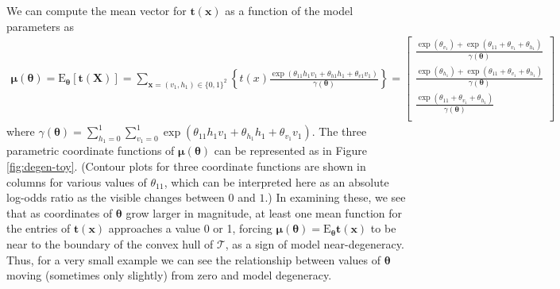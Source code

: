 \documentclass[AMS,STIX1COL]{WileyNJD-v2}
\begin{document}
We can compute the mean vector for \(\boldsymbol t(\boldsymbol x)\) as a
function of the model parameters as \begin{align*}
\boldsymbol \mu(\boldsymbol \theta) = \text{E}_{\boldsymbol \theta}\left[ \boldsymbol t(\boldsymbol X) \right] =  \sum\limits_{\boldsymbol x = (v_1, h_1) \in \{0,1\}^2} \left\{ t(x) \frac{\exp\left( \theta_{11} h_1 v_1 + \theta_{h1} h_1 + \theta_{v1} v_1\right)}{\gamma(\boldsymbol \theta)} \right\} = \left[
\begin{matrix}
\frac{\exp\left(\theta_{v_1}\right) + \exp\left(\theta_{11} + \theta_{v_1} + \theta_{h_1}\right)}{\gamma(\boldsymbol \theta)} \\
\frac{\exp\left(\theta_{h_1}\right) + \exp\left(\theta_{11} + \theta_{v_1} + \theta_{h_1}\right)}{\gamma(\boldsymbol \theta)} \\
\frac{\exp\left(\theta_{11} + \theta_{v_1} + \theta_{h_1}\right)}{\gamma(\boldsymbol \theta)} \\
\end{matrix} \right]
\end{align*} where
\(\gamma(\boldsymbol \theta) = \sum\limits_{h_1 = 0}^1\sum\limits_{v_1 = 0}^1 \exp(\theta_{11} h_1 v_1 + \theta_{h_1}h_1 + \theta_{v_1}v_1)\).
The three parametric coordinate functions of
\(\boldsymbol \mu(\boldsymbol \theta)\) can be represented as in Figure
\ref{fig:degen-toy}. (Contour plots for three coordinate functions are
shown in columns for various values of \(\theta_{11}\), which can be
interpreted here as an absolute log-odds ratio as the visible changes
between \(0\) and \(1\).) In examining these, we see that as coordinates
of \(\boldsymbol \theta\) grow larger in magnitude, at least one mean
function for the entries of \(\boldsymbol t(\boldsymbol x)\) approaches
a value 0 or 1, forcing
\(\boldsymbol \mu(\boldsymbol \theta) = \text{E}_{\boldsymbol \theta} \boldsymbol t(\boldsymbol x)\)
to be near to the boundary of the convex hull of \(\mathcal{T}\), as a
sign of model near-degeneracy. Thus, for a very small example we can see
the relationship between values of \(\boldsymbol \theta\) moving
(sometimes only slightly) from zero and model degeneracy.

\par
\end{document}
